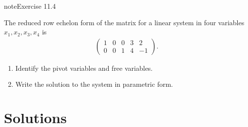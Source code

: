 \documentclass[letterpaper,10pt,english]{jupyterBook}
\begin{document}
\begin{sphinxadmonition}{note}{Exercise 11.4}



\sphinxAtStartPar
The reduced row echelon form of the matrix for a linear system in four variables \(x_1, x_2, x_3, x_4\) is
\begin{equation*}
\begin{split}\left(\begin{array}{cccc|c}1 & 0 & 0 & 3 & 2\\
0 & 0 & 1 & 4 & -1\end{array}\right).\end{split}
\end{equation*}\begin{enumerate}
%
\item {} 
\sphinxAtStartPar
Identify the pivot variables and free variables.

\item {} 
\sphinxAtStartPar
Write the solution to the system in parametric form.

\end{enumerate}
\end{sphinxadmonition}


\section{Solutions}
\label{\detokenize{LinearAlgebra/linear_systems_matrices/echelon_form:solutions}} \label{LinearAlgebra/linear_systems_matrices/echelon_form:LinearAlgebra/linear_systems_matrices/echelon_form-solution-4}
\end{document}
